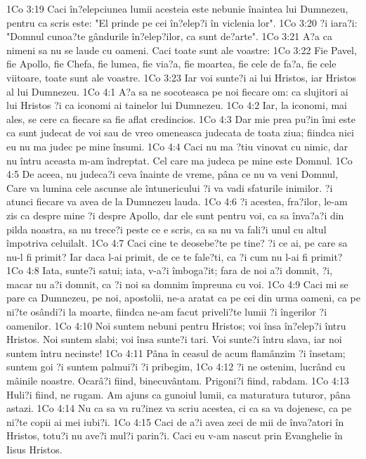1Co 3:19  Caci în?elepciunea lumii acesteia este nebunie înaintea lui Dumnezeu, pentru ca scris este: "El prinde pe cei în?elep?i în viclenia lor".
1Co 3:20  ?i iara?i: "Domnul cunoa?te gândurile în?elep?ilor, ca sunt de?arte".
1Co 3:21  A?a ca nimeni sa nu se laude cu oameni. Caci toate sunt ale voastre:
1Co 3:22  Fie Pavel, fie Apollo, fie Chefa, fie lumea, fie via?a, fie moartea, fie cele de fa?a, fie cele viitoare, toate sunt ale voastre.
1Co 3:23  Iar voi sunte?i ai lui Hristos, iar Hristos al lui Dumnezeu.
1Co 4:1  A?a sa ne socoteasca pe noi fiecare om: ca slujitori ai lui Hristos ?i ca iconomi ai tainelor lui Dumnezeu.
1Co 4:2  Iar, la iconomi, mai ales, se cere ca fiecare sa fie aflat credincios.
1Co 4:3  Dar mie prea pu?in îmi este ca sunt judecat de voi sau de vreo omeneasca judecata de toata ziua; fiindca nici eu nu ma judec pe mine însumi.
1Co 4:4  Caci nu ma ?tiu vinovat cu nimic, dar nu întru aceasta m-am îndreptat. Cel care ma judeca pe mine este Domnul.
1Co 4:5  De aceea, nu judeca?i ceva înainte de vreme, pâna ce nu va veni Domnul, Care va lumina cele ascunse ale întunericului ?i va vadi sfaturile inimilor. ?i atunci fiecare va avea de la Dumnezeu lauda.
1Co 4:6  ?i acestea, fra?ilor, le-am zis ca despre mine ?i despre Apollo, dar ele sunt pentru voi, ca sa înva?a?i din pilda noastra, sa nu trece?i peste ce e scris, ca sa nu va fali?i unul cu altul împotriva celuilalt.
1Co 4:7  Caci cine te deosebe?te pe tine? ?i ce ai, pe care sa nu-l fi primit? Iar daca l-ai primit, de ce te fale?ti, ca ?i cum nu l-ai fi primit?
1Co 4:8  Iata, sunte?i satui; iata, v-a?i îmboga?it; fara de noi a?i domnit, ?i, macar nu a?i domnit, ca ?i noi sa domnim împreuna cu voi.
1Co 4:9  Caci mi se pare ca Dumnezeu, pe noi, apostolii, ne-a aratat ca pe cei din urma oameni, ca pe ni?te osândi?i la moarte, fiindca ne-am facut priveli?te lumii ?i îngerilor ?i oamenilor.
1Co 4:10  Noi suntem nebuni pentru Hristos; voi însa în?elep?i întru Hristos. Noi suntem slabi; voi însa sunte?i tari. Voi sunte?i întru slava, iar noi suntem întru necinste!
1Co 4:11  Pâna în ceasul de acum flamânzim ?i însetam; suntem goi ?i suntem palmui?i ?i pribegim,
1Co 4:12  ?i ne ostenim, lucrând cu mâinile noastre. Ocarâ?i fiind, binecuvântam. Prigoni?i fiind, rabdam.
1Co 4:13  Huli?i fiind, ne rugam. Am ajuns ca gunoiul lumii, ca maturatura tuturor, pâna astazi.
1Co 4:14  Nu ca sa va ru?inez va scriu acestea, ci ca sa va dojenesc, ca pe ni?te copii ai mei iubi?i.
1Co 4:15  Caci de a?i avea zeci de mii de înva?atori în Hristos, totu?i nu ave?i mul?i parin?i. Caci eu v-am nascut prin Evanghelie în Iisus Hristos.
